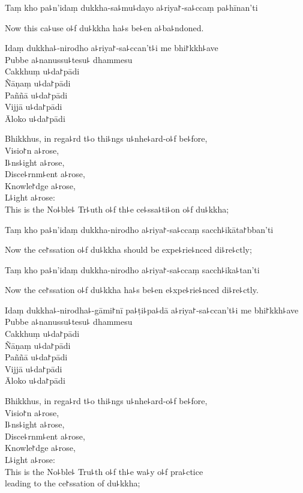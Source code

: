 Taṃ kho pa꜕n'idaṃ dukkha-sa꜕mu꜕dayo a꜕riya꜓-sa꜕ccaṃ pa꜕hīnan'ti

\begin{english}
  Now this ca꜕use o꜕f du꜕kkha ha꜕s be꜕en a꜕ba꜕ndoned.
\end{english}

Idaṃ dukkha꜕-nirodho a꜕riya꜓-sa꜕ccan't꜕i me bhi꜓kkh꜕ave\\
Pubbe a꜕nanussu꜕tesu꜕ dhammesu\\
Cakkhuṃ u꜕da꜓pādi\\
Ñāṇaṃ u꜕da꜓pādi\\
Paññā u꜕da꜓pādi\\
Vijjā u꜕da꜓pādi\\
Āloko u꜕da꜓pādi

\begin{english}
  Bhikkhus, in rega꜕rd t꜕o thi꜕ngs u꜕nhe꜕ard-o꜕f be꜕fore,\\
  Visio꜓n a꜕rose,\\
  I꜕ns꜕ight a꜕rose,\\
  Disce꜕rnm꜕ent a꜕rose,\\
  Knowle꜓dge a꜕rose,\\
  L꜕ight a꜕rose:\\
  This is the No꜕ble꜕ Tr꜕uth o꜕f th꜕e ce꜕ssa꜕ti꜕on o꜕f du꜕kkha;
\end{english}

Taṃ kho pa꜕n'idaṃ dukkha-nirodho a꜕riya꜓-sa꜕ccaṃ sacch꜕ikāta꜓bban'ti

\begin{english}
  Now the ce꜓ssation o꜕f du꜕kkha should be expe꜕rie꜕nced di꜕re꜕ctly;
\end{english}

Taṃ kho pa꜕n'idaṃ dukkha-nirodho a꜕riya꜓-sa꜕ccaṃ sacch꜕ika꜕tan'ti

\begin{english}
  Now the ce꜓ssation o꜕f du꜕kkha ha꜕s be꜕en e꜕xpe꜕rie꜕nced di꜕re꜕ctly.
\end{english}

Idaṃ dukkha꜕-nirodha꜕-gāmi꜓nī pa꜕ṭi꜕pa꜕dā a꜕riya꜓-sa꜕ccan't꜕i me bhi꜓kkh꜕ave\\
Pubbe a꜕nanussu꜕tesu꜕ dhammesu\\
Cakkhuṃ u꜕da꜓pādi\\
Ñāṇaṃ u꜕da꜓pādi\\
Paññā u꜕da꜓pādi\\
Vijjā u꜕da꜓pādi\\
Āloko u꜕da꜓pādi

\begin{english}
  Bhikkhus, in rega꜕rd t꜕o thi꜕ngs u꜕nhe꜕ard-o꜕f be꜕fore,\\
  Visio꜓n a꜕rose,\\
  I꜕ns꜕ight a꜕rose,\\
  Disce꜕rnm꜕ent a꜕rose,\\
  Knowle꜓dge a꜕rose,\\
  L꜕ight a꜕rose:\\
  \ifaivedition
  \clearpage
  \fi
  This is the No꜕ble꜕ Tru꜕th o꜕f th꜕e wa꜕y o꜕f pra꜕ctice\\
  leading to the ce꜓ssation of du꜕kkha;
\end{english}


